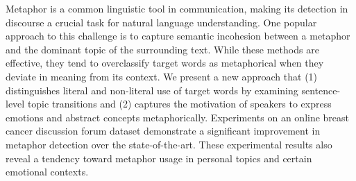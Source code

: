 Metaphor is a common linguistic tool in communication, making its detection in discourse a crucial task for natural language understanding. One popular approach to this challenge is to capture semantic incohesion between a metaphor and the dominant topic of the surrounding text. While these methods are effective, they tend to overclassify target words as metaphorical when they deviate in meaning from its context. We present a new approach that (1) distinguishes literal and non-literal use of target words by examining sentence-level topic transitions and (2) captures the motivation of speakers to express emotions and abstract concepts metaphorically. Experiments on an online breast cancer discussion forum dataset demonstrate a significant improvement in metaphor detection over the state-of-the-art. These experimental results also reveal a tendency toward metaphor usage in personal topics and certain emotional contexts.
